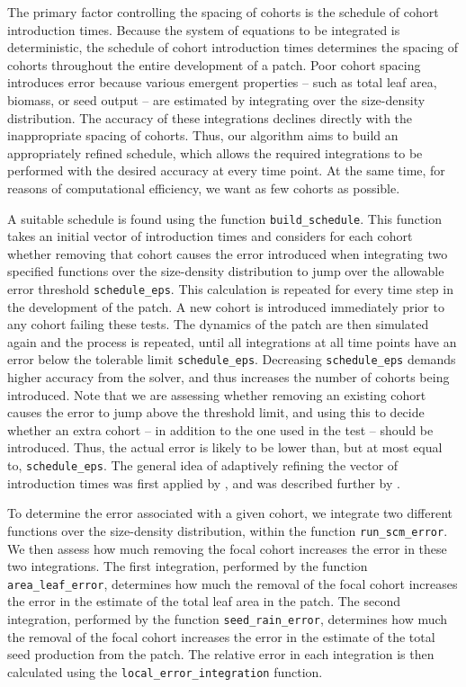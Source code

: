\documentclass[10pt,twoside]{article}
\begin{document}
The primary factor controlling the spacing of cohorts is the schedule of
cohort introduction times. Because the system of equations to be integrated is deterministic, the
schedule of cohort introduction times determines the spacing of cohorts
throughout the entire development of a patch. Poor cohort spacing
introduces error because various emergent properties -- such as total
leaf area, biomass, or seed output -- are estimated by integrating over
the size-density distribution. The accuracy of these integrations declines
directly with the inappropriate spacing of cohorts. Thus, our algorithm aims to build an
appropriately refined schedule, which allows the required integrations to be
performed with the desired accuracy at every time point. At the same
time, for reasons of computational efficiency, we want as few cohorts as possible.

A suitable schedule is found using the function \texttt{build\_schedule}.
This function takes an
initial vector of introduction times and considers for each cohort
whether removing that cohort causes the error introduced when
integrating two specified functions over the size-density distribution to jump
over the allowable error threshold \texttt{schedule\_eps}. This
calculation is repeated for every time step in the development of the
patch. A new cohort is introduced immediately prior to any cohort
failing these tests. The dynamics of the patch are
then simulated again and the process is repeated, until all integrations at
all time points have an error below the tolerable limit
\texttt{schedule\_eps}. Decreasing \texttt{schedule\_eps} demands higher
accuracy from the solver, and thus increases the number of cohorts being
introduced. Note that we are assessing whether removing an existing cohort
causes the error to jump above the threshold limit, and using this to decide
whether an extra cohort -- in addition to the one used in the test --
should be introduced. Thus, the actual error is likely to
be lower than, but at most equal to, \texttt{schedule\_eps}. The general idea
of adaptively refining the vector of introduction times was first applied
by \citet{Falster-2011}, and was described further by \citet{Falster-2015}.

To determine the error associated with a given cohort, we integrate
two different functions over the size-density distribution, within the function
\texttt{run\_scm\_error}. We then assess how much removing the focal
cohort increases the error in these two integrations. The first
integration, performed by the function \texttt{area\_leaf\_error}, determines
how much the removal of the focal cohort increases the error in the
estimate of the total leaf area in the patch. The second integration,
performed by the function \texttt{seed\_rain\_error}, determines how much
the removal of the focal cohort increases the error in the estimate of the total seed
production from the patch. The relative error in each integration is then
calculated using the \texttt{local\_error\_integration} function.
\end{document}
